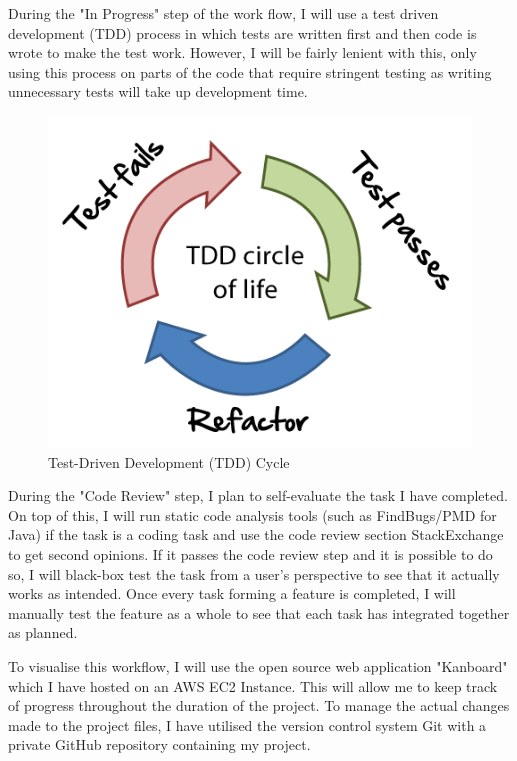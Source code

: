 \documentclass[]{report}
\begin{document}
	During the "In Progress" step of the work flow, I will use a test driven development (TDD) process in which tests are written first and then code is wrote to make the test work. However, I will be fairly lenient with this, only using this process on parts of the code that require stringent testing as writing unnecessary tests will take up development time. 
	\begin{figure}[h!]
		\caption{
			Test-Driven Development (TDD) Cycle
			\cite{TDD Diagram}
		}
		\centering
		\includegraphics[scale=0.5]{tdd-circle-of-life.png}
	\end{figure}
	During the "Code Review" step, I plan to self-evaluate the task I have completed. On top of this, I will run static code analysis tools (such as FindBugs/PMD for Java) if the task is a coding task and use the code review section StackExchange to get second opinions. If it passes the code review step and it is possible to do so, I will black-box test the task from a user's perspective to see that it actually works as intended. Once every task forming a feature is completed, I will manually test the feature as a whole to see that each task has integrated together as planned.
	
	To visualise this workflow, I will use the open source web application "Kanboard" which I have hosted on an AWS EC2 Instance. This will allow me to keep track of progress throughout the duration of the project. To manage the actual changes made to the project files, I have utilised the version control system Git with a private GitHub repository containing my project.
		
\end{document}
